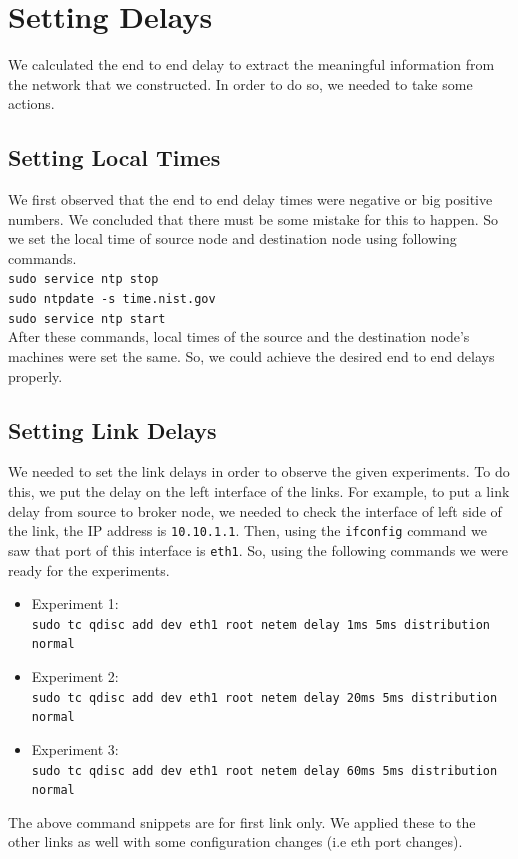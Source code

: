 \documentclass[conference]{IEEEtran}
\begin{document}
\section{Setting Delays}
We calculated the end to end delay to extract the meaningful information from the network that we constructed. In order to do so, we needed to take some actions.
\subsection{Setting Local Times}
We first observed that the end to end delay times were negative or big positive numbers. We concluded that there must be some mistake for this to happen. So we set the local time of source node and destination node using following commands. \\
\texttt{sudo service ntp stop} \\
\texttt{sudo ntpdate -s time.nist.gov} \\
\texttt{sudo service ntp start} \\
After these commands, local times of the source and the destination node's machines were set the same. So, we could achieve the desired end to end delays properly.
\subsection{Setting Link Delays}
We needed to set the link delays in order to observe the given experiments. To do this, we put the delay on the left interface of the links. For example, to put a link delay from source to broker node, we needed to check the interface of left side of the link, the IP address is \texttt{10.10.1.1}. Then, using the \texttt{ifconfig} command we saw that port of this interface is \texttt{eth1}. So, using the following commands we were ready for the experiments. \\
\begin{itemize}
    \item Experiment 1: \\
    \texttt{sudo tc qdisc add dev eth1 root netem delay 1ms 5ms distribution normal}
    \item Experiment 2: \\
    \texttt{sudo tc qdisc add dev eth1 root netem delay 20ms 5ms distribution normal}
    \item Experiment 3: \\
    \texttt{sudo tc qdisc add dev eth1 root netem delay 60ms 5ms distribution normal}
\end{itemize}
The above command snippets are for first link only. We applied these to the other links as well with some configuration changes (i.e eth port changes).
\end{document}
